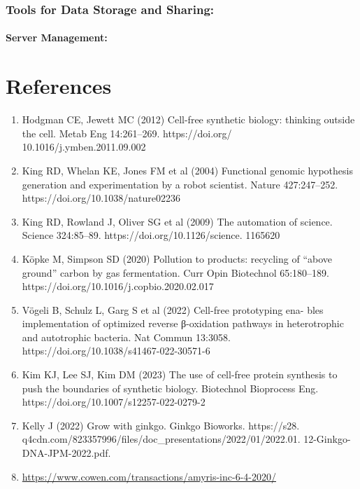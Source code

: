 \documentclass[
  letterpaper,
]{book}
\begin{document}
\subsection{Tools for Data Storage and
Sharing:}\label{tools-for-data-storage-and-sharing}

\subsubsection{Server Management:}\label{server-management}


\chapter{References}\label{references}

\begin{enumerate}
\def\labelenumi{\arabic{enumi}.}
\item
  Hodgman CE, Jewett MC (2012) Cell-free synthetic biology: thinking
  outside the cell. Metab Eng 14:261--269. https://doi.org/
  10.1016/j.ymben.2011.09.002
\item
  King RD, Whelan KE, Jones FM et al (2004) Functional genomic
  hypothesis generation and experimentation by a robot scientist. Nature
  427:247--252. https://doi.org/10.1038/nature02236
\item
  King RD, Rowland J, Oliver SG et al (2009) The automation of science.
  Science 324:85--89. https://doi.org/10.1126/science. 1165620
\item
  Köpke M, Simpson SD (2020) Pollution to products: recycling of ``above
  ground'' carbon by gas fermentation. Curr Opin Biotechnol 65:180--189.
  https://doi.org/10.1016/j.copbio.2020.02.017
\item
  Vögeli B, Schulz L, Garg S et al (2022) Cell-free prototyping ena-
  bles implementation of optimized reverse β-oxidation pathways in
  heterotrophic and autotrophic bacteria. Nat Commun 13:3058.
  https://doi.org/10.1038/s41467-022-30571-6
\item
  Kim KJ, Lee SJ, Kim DM (2023) The use of cell-free protein synthesis
  to push the boundaries of synthetic biology. Biotechnol Bioprocess
  Eng. https://doi.org/10.1007/s12257-022-0279-2
\item
  Kelly J (2022) Grow with ginkgo. Ginkgo Bioworks. https://s28.
  q4cdn.com/823357996/files/doc\_presentations/2022/01/2022.01.
  12-Ginkgo-DNA-JPM-2022.pdf.
\item
  \url{https://www.cowen.com/transactions/amyris-inc-6-4-2020/}

\end{enumerate}
\end{document}
